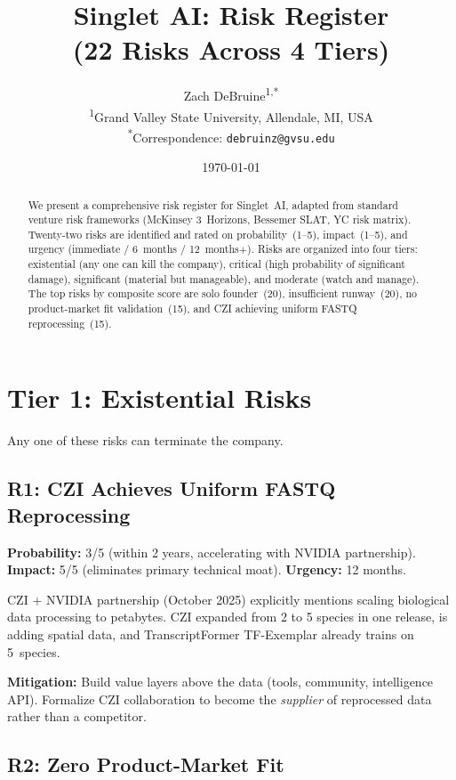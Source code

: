 \documentclass[10pt,twocolumn,letterpaper]{article}
\title{Singlet AI: Risk Register\\
  (22 Risks Across 4 Tiers)}
\author{%
  Zach DeBruine\textsuperscript{1,*}\\[4pt]
  \textsuperscript{1}Grand Valley State University, Allendale, MI, USA\\
  \textsuperscript{*}Correspondence: \texttt{debruinz@gvsu.edu}
}
\date{\today}
\begin{document}
\maketitle

\begin{abstract}
We present a comprehensive risk register for Singlet~AI, adapted from standard
venture risk frameworks (McKinsey 3~Horizons, Bessemer SLAT, YC risk matrix).
Twenty-two risks are identified and rated on probability~(1--5), impact~(1--5),
and urgency (immediate / 6~months / 12~months+). Risks are organized into four
tiers: existential (any one can kill the company), critical (high probability of
significant damage), significant (material but manageable), and moderate (watch
and manage). The top risks by composite score are solo founder~(20), insufficient
runway~(20), no product-market fit validation~(15), and CZI achieving uniform
FASTQ reprocessing~(15).
\end{abstract}

\section{Tier 1: Existential Risks}
\label{sec:existential}

Any one of these risks can terminate the company.

\subsection{R1: CZI Achieves Uniform FASTQ Reprocessing}

\textbf{Probability:} 3/5 (within 2 years, accelerating with NVIDIA partnership).
\textbf{Impact:} 5/5 (eliminates primary technical moat).
\textbf{Urgency:} 12 months.

CZI + NVIDIA partnership (October 2025) explicitly mentions scaling biological
data processing to petabytes. CZI expanded from 2 to 5 species in one release,
is adding spatial data, and TranscriptFormer TF-Exemplar already trains on
5~species.

\textbf{Mitigation:} Build value layers above the data (tools, community,
intelligence API). Formalize CZI collaboration to become the \emph{supplier}
of reprocessed data rather than a competitor.

\subsection{R2: Zero Product-Market Fit}
\end{document}
